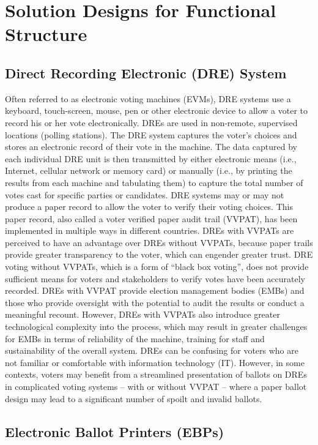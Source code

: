 \documentclass{article}
\begin{document}
\section{Solution Designs for Functional Structure}

\subsection{Direct Recording Electronic (DRE) System}

Often referred to as electronic voting machines (EVMs), DRE systems use a keyboard, touch-screen, mouse, pen or other electronic device to allow a voter to record his or her vote electronically. DREs are used in non-remote, supervised locations (polling stations). The DRE system captures the voter’s choices and stores an electronic record of their vote in the machine. The data captured by each individual DRE unit is then transmitted by either electronic means (i.e., Internet, cellular network or memory card) or manually (i.e., by printing the results from each machine and tabulating them) to capture the total number of votes cast for specific parties or candidates. DRE systems may or may not produce a paper record to allow the voter to verify their voting choices. This paper record, also called a voter verified paper audit trail (VVPAT), has been implemented in multiple ways in different countries.
DREs with VVPATs are perceived to have an advantage over DREs without VVPATs, because paper trails provide greater transparency to the voter, which can engender greater trust. DRE voting without VVPATs, which is a form of “black box voting”, does not provide sufficient means for voters and stakeholders to verify votes have been accurately recorded. DREs with VVPAT provide election management bodies (EMBs) and those who provide oversight with the potential to audit the results or conduct a meaningful recount. However, DREs with VVPATs also introduce greater technological complexity into the process, which may result in greater challenges for EMBs in terms of reliability of the machine, training for staff and sustainability of the overall system. 
DREs can be confusing for voters who are not familiar or comfortable with information technology (IT). However, in some contexts, voters may benefit from a streamlined presentation of ballots on DREs in complicated voting systems – with or without VVPAT – where a paper ballot design may lead to a significant number of spoilt and invalid ballots.

\subsection{Electronic Ballot Printers (EBPs)}
 
\end{document}
